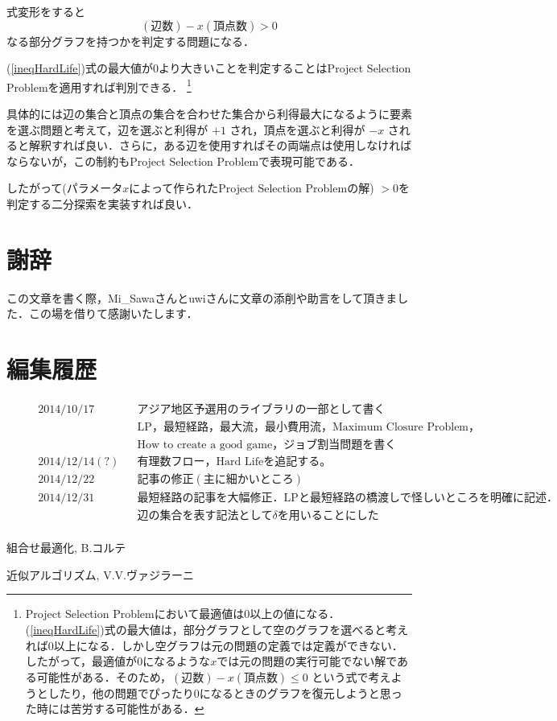 \documentclass[13pt, a4paper, landscape]{jarticle}
\theoremstyle{nonitalic} %
\begin{document}
式変形をすると
\begin{equation}
  (\textrm{辺数}) - x (\textrm{頂点数}) > 0 \label{ineqHardLife}
\end{equation}
なる部分グラフを持つかを判定する問題になる．

(\ref{ineqHardLife})式の最大値が$0$より大きいことを判定することはProject Selection Problemを適用すれば判別できる． \footnote{ Project Selection Problemにおいて最適値は$0$以上の値になる．(\ref{ineqHardLife})式の最大値は，部分グラフとして空のグラフを選べると考えれば$0$以上になる．しかし空グラフは元の問題の定義では定義ができない．したがって，最適値が$0$になるような$x$では元の問題の実行可能でない解である可能性がある．そのため，$ (\textrm{辺数}) - x (\textrm{頂点数}) \leq 0 $  という式で考えようとしたり，他の問題でぴったり$0$になるときのグラフを復元しようと思った時には苦労する可能性がある．}

具体的には辺の集合と頂点の集合を合わせた集合から利得最大になるように要素を選ぶ問題と考えて，辺を選ぶと利得が $+1$ され，頂点を選ぶと利得が $-x$ されると解釈すれば良い．さらに，ある辺を使用すればその両端点は使用しなければならないが，この制約もProject Selection Problemで表現可能である． 

したがって(パラメータ$x$によって作られたProject Selection Problemの解) $>0$を判定する二分探索を実装すれば良い． 





\section*{謝辞}
この文章を書く際，Mi\_Sawaさんとuwiさんに文章の添削や助言をして頂きました．この場を借りて感謝いたします．

\section*{編集履歴}
\begin{align*}
  &&& 2014/10/17 && アジア地区予選用のライブラリの一部として書く &&&\\
  &&&            && \mathrm{LP}， 最短経路， 最大流， 最小費用流， \textrm{Maximum Closure Problem}， \\
  &&&            &&\textrm{How to create a good game}， ジョブ割当問題を書く \\
  &&& 2014/12/14(?) && 有理数フロー， \textrm{Hard Life}を追記する。 \\
  &&& 2014/12/22    && 記事の修正(主に細かいところ)\\
  &&& 2014/12/31    && 最短経路の記事を大幅修正．\textrm{LP}と最短経路の橋渡しで怪しいところを明確に記述．\\
  &&&               && 辺の集合を表す記法として \delta を用いることにした\\
\end{align*}

\begin{thebibliography}{99}
 組合せ最適化, B.コルテ

 近似アルゴリズム, V.V.ヴァジラーニ


\end{thebibliography}
\end{document}
